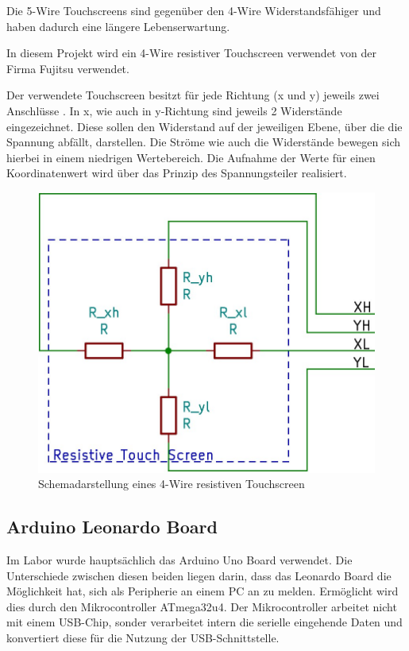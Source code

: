 Die 5-Wire Touchscreens sind gegenüber den 4-Wire Widerstandsfähiger und haben dadurch eine längere Lebenserwartung.\cite{5w4w}

In diesem Projekt wird ein 4-Wire resistiver Touchscreen verwendet von der Firma Fujitsu verwendet.

Der verwendete Touchscreen besitzt für jede Richtung (x und y) jeweils zwei Anschlüsse . In x, wie auch in y-Richtung sind jeweils 2 Widerstände eingezeichnet. Diese sollen den Widerstand auf der jeweiligen Ebene, über die die Spannung abfällt, darstellen.
Die Ströme wie auch die Widerstände bewegen sich hierbei in einem niedrigen Wertebereich. 
Die Aufnahme der Werte für einen Koordinatenwert wird über das Prinzip des Spannungsteiler realisiert.
\begin{figure}
    \centering
    \includegraphics[width=0.6\linewidth]{fig/4-wire.jpg}
    \caption{Schemadarstellung eines 4-Wire resistiven Touchscreen}
    \label{fig:4w}
\end{figure}
\subsection{Arduino Leonardo Board}
Im Labor wurde hauptsächlich das Arduino Uno Board verwendet. Die Unterschiede zwischen diesen beiden liegen darin, dass das Leonardo Board die Möglichkeit hat, sich als Peripherie an einem PC an zu melden. 
Ermöglicht wird dies durch den Mikrocontroller ATmega32u4. 
Der Mikrocontroller arbeitet nicht mit einem USB-Chip, sonder verarbeitet intern die serielle eingehende Daten und konvertiert diese für die Nutzung der USB-Schnittstelle.

